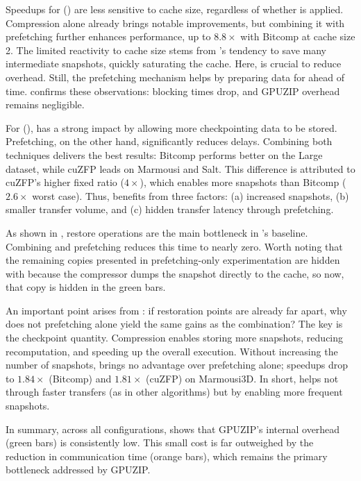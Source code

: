 \documentclass[Ingles]{ic-tese-v3}
\begin{document}
Speedups for \zcut () are less sensitive to cache size, regardless of whether \compression is applied. Compression alone already brings notable improvements, but combining it with prefetching further enhances performance, up to $8.8\times$ with Bitcomp at cache size 2. The limited reactivity to cache size stems from \zcut's tendency to save many intermediate snapshots, quickly saturating the cache. Here, \compression is crucial to reduce \save overhead. Still, the prefetching mechanism helps by preparing data for \restore ahead of time.  confirms these observations: blocking times drop, and GPUZIP overhead remains negligible.

For \uniform (), \compression has a strong impact by allowing more checkpointing data to be stored. Prefetching, on the other hand, significantly reduces \htd delays. Combining both techniques delivers the best results: Bitcomp performs better on the Large dataset, while cuZFP leads on Marmousi and Salt. This difference is attributed to cuZFP's higher fixed \compression ratio ($4\times$), which enables more snapshots than Bitcomp ($2.6\times$ worst case). Thus, \uniform benefits from three factors: (a) increased snapshots, (b) smaller transfer volume, and (c) hidden transfer latency through prefetching.

As shown in , restore operations are the main bottleneck in \uniform's baseline. Combining \compression and prefetching reduces this time to nearly zero. Worth noting that the remaining \dtd copies presented in prefetching-only experimentation are hidden with \compression because the compressor dumps the snapshot directly to the cache, so now, that \dtd copy is hidden in the green bars.

An important point arises from \uniform: if restoration points are already far apart, why does not prefetching alone yield the same gains as the combination? The key is the checkpoint quantity. Compression enables storing more snapshots, reducing recomputation, and speeding up the overall execution. Without increasing the number of snapshots, \compression brings no advantage over prefetching alone; speedups drop to $1.84\times$ (Bitcomp) and $1.81\times$ (cuZFP) on Marmousi3D. In short, \compression helps not through faster transfers (as in other \checkpointing algorithms) but by enabling more frequent snapshots.

In summary, across all configurations,  shows that GPUZIP's internal overhead (green bars) is consistently low. This small cost is far outweighed by the reduction in communication time (orange bars), which remains the primary bottleneck addressed by GPUZIP.
\end{document}
